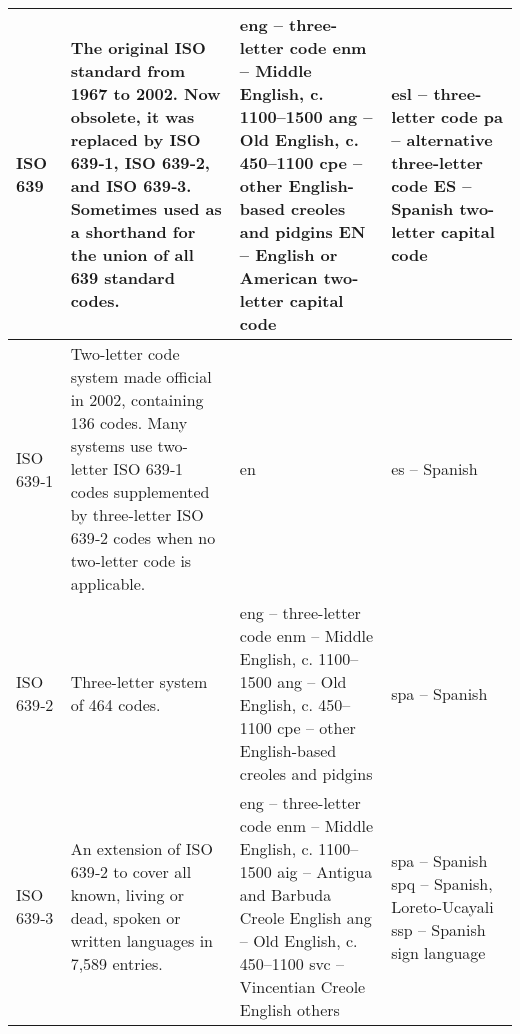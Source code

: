 \begin{landscape}
\begin{longtable}{|p{80pt}|p{200pt}|p{140pt}|p{140pt}|}
\endlastfoot
\hline
ISO 639	&The original ISO standard from 1967 to 2002. 
			 Now obsolete, it was replaced by ISO 639‑1, 
			 ISO 639‑2, and ISO 639‑3. Sometimes used as 
			 a shorthand for the union of all 639 standard codes.	& eng – three-letter code 
																	\newline enm – Middle English, c. 1100–1500 
																	\newline ang – Old English, c. 450–1100 
																	\newline cpe – other English-based creoles and pidgins 
																	\newline EN – English or American two-letter capital code	& esl – three-letter code 
																															\newline pa – alternative three-letter code 
																															\newline ES – Spanish two-letter capital code\\
\hline
ISO 639‑1	&Two-letter code system made official in 2002, 
			 containing 136 codes. Many systems use two-letter 
			 ISO 639‑1 codes supplemented by three-letter ISO 
			 639‑2 codes when no two-letter code is applicable.	&en															&es – Spanish\\
\hline
ISO 639‑2	&Three-letter system of 464 codes.					&eng – three-letter code 
																\newline enm – Middle English, c. 1100–1500
																\newline ang – Old English, c. 450–1100
																\newline cpe – other English-based creoles and pidgins		&spa – Spanish\\
\hline
ISO 639‑3	&An extension of ISO 639‑2 to cover all known,
			 living or dead, \newline spoken or written languages in 7,589 entries.	&eng – three-letter code 
																		\newline enm – Middle English, c. 1100–1500 
																		\newline aig – Antigua and Barbuda Creole English 
																		\newline ang – Old English, c. 450–1100 
																		\newline svc – Vincentian Creole English 
																		\newline others										&spa – Spanish 
																															\newline spq – Spanish, Loreto-Ucayali 
																															\newline ssp – Spanish sign language 

\end{longtable}
\end{landscape}
